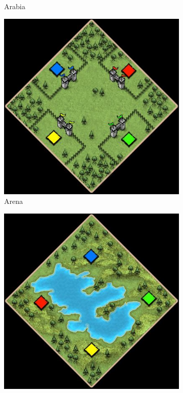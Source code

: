 \begin{figure}
\begin{subfigure}{0.22\textwidth}
        \caption{Arabia}
    \end{subfigure}\quad%
    \begin{subfigure}{0.22\textwidth}
        \centering
        \includegraphics[width=1.0\textwidth]{src/images/maps/rm-arena}
        \caption{Arena}
    \end{subfigure}\quad%
    \begin{subfigure}{0.22\textwidth}
        \centering
        \includegraphics[width=1.0\textwidth]{src/images/maps/rm-baltic}

\end{subfigure}
\end{figure}
